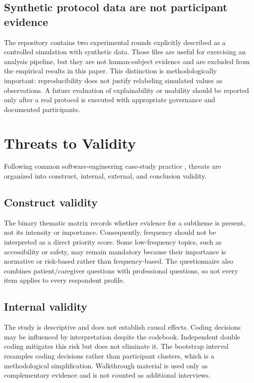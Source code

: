 \documentclass[10pt,a4paper]{article}
\begin{document}
\subsection{Synthetic protocol data are not participant evidence}
The repository contains two experimental rounds explicitly described as a controlled simulation with synthetic data. Those files are useful for exercising an analysis pipeline, but they are not human-subject evidence and are excluded from the empirical results in this paper. This distinction is methodologically important: reproducibility does not justify relabeling simulated values as observations. A future evaluation of explainability or usability should be reported only after a real protocol is executed with appropriate governance and documented participants.

\section{Threats to Validity}
Following common software-engineering case-study practice \citep{runeson2009guidelines,wohlin2012experimentation}, threats are organized into construct, internal, external, and conclusion validity.

\subsection{Construct validity}
The binary thematic matrix records whether evidence for a subtheme is present, not its intensity or importance. Consequently, frequency should not be interpreted as a direct priority score. Some low-frequency topics, such as accessibility or safety, may remain mandatory because their importance is normative or risk-based rather than frequency-based. The questionnaire also combines patient/caregiver questions with professional questions, so not every item applies to every respondent profile.

\subsection{Internal validity}
The study is descriptive and does not establish causal effects. Coding decisions may be influenced by interpretation despite the codebook. Independent double coding mitigates this risk but does not eliminate it. The bootstrap interval resamples coding decisions rather than participant clusters, which is a methodological simplification. Walkthrough material is used only as complementary evidence and is not counted as additional interviews.
\end{document}
